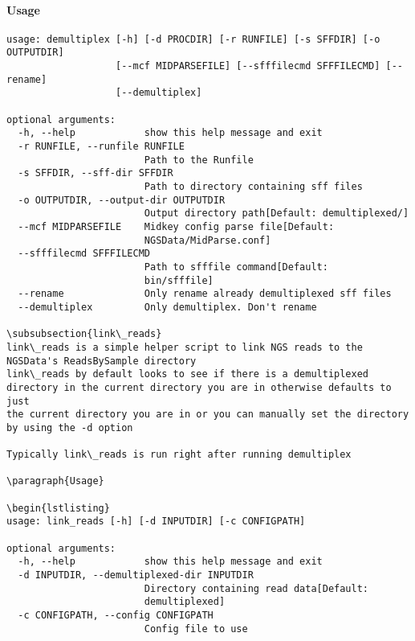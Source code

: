 \documentclass{article}
\begin{document}
\paragraph{Usage}

\begin{lstlisting}
usage: demultiplex [-h] [-d PROCDIR] [-r RUNFILE] [-s SFFDIR] [-o OUTPUTDIR]
                   [--mcf MIDPARSEFILE] [--sfffilecmd SFFFILECMD] [--rename]
                   [--demultiplex]

optional arguments:
  -h, --help            show this help message and exit
  -r RUNFILE, --runfile RUNFILE
                        Path to the Runfile
  -s SFFDIR, --sff-dir SFFDIR
                        Path to directory containing sff files
  -o OUTPUTDIR, --output-dir OUTPUTDIR
                        Output directory path[Default: demultiplexed/]
  --mcf MIDPARSEFILE    Midkey config parse file[Default:
                        NGSData/MidParse.conf]
  --sfffilecmd SFFFILECMD
                        Path to sfffile command[Default:
                        bin/sfffile]
  --rename              Only rename already demultiplexed sff files
  --demultiplex         Only demultiplex. Don't rename

\subsubsection{link\_reads}
link\_reads is a simple helper script to link NGS reads to the NGSData's ReadsBySample directory
link\_reads by default looks to see if there is a demultiplexed directory in the current directory you are in otherwise defaults to just
the current directory you are in or you can manually set the directory by using the -d option

Typically link\_reads is run right after running demultiplex

\paragraph{Usage}

\begin{lstlisting}
usage: link_reads [-h] [-d INPUTDIR] [-c CONFIGPATH]

optional arguments:
  -h, --help            show this help message and exit
  -d INPUTDIR, --demultiplexed-dir INPUTDIR
                        Directory containing read data[Default:
                        demultiplexed]
  -c CONFIGPATH, --config CONFIGPATH
                        Config file to use
\end{lstlisting}
\end{document}
